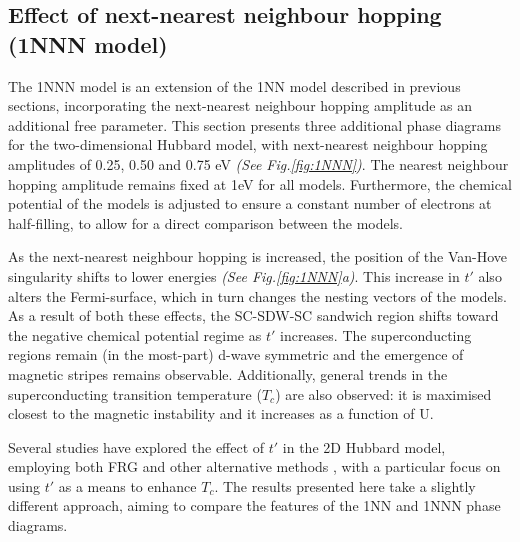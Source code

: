 \documentclass[12pt]{article}
\begin{document}
\subsection{Effect of next-nearest neighbour hopping (1NNN model)}
\label{subsec:1NNNModel}
The 1NNN model is an extension of the 1NN model described in previous sections, incorporating
the next-nearest neighbour hopping amplitude as an additional free parameter.
This section presents three additional phase diagrams
for the two-dimensional Hubbard model, with next-nearest neighbour hopping amplitudes 
of 0.25, 0.50 and 0.75 eV \textit{(See Fig.\ref{fig:1NNN})}.
The nearest neighbour hopping amplitude remains fixed at 1eV for all models. 
Furthermore, the chemical potential of the models is adjusted to ensure a 
constant number of electrons at half-filling, to allow for a direct comparison between the models. \par
\medskip
\noindent
As the next-nearest neighbour hopping is increased, the position of the Van-Hove singularity shifts to lower energies \textit{(See Fig.\ref{fig:1NNN}a)}. 
This increase in $t'$ also alters the Fermi-surface, which in turn changes the nesting vectors of the models. 
As a result of both these effects, the SC-SDW-SC sandwich 
region shifts toward the negative chemical potential regime as $t'$ increases.
The superconducting regions remain (in the most-part) d-wave symmetric and the emergence of 
magnetic stripes remains observable. Additionally, general trends in the superconducting transition
temperature ($T_c$) are also observed: it is maximised closest to the 
magnetic instability and it increases as a function of U.\par
\medskip
\noindent Several studies have explored the effect of $t'$ in the 2D Hubbard model, 
employing both FRG \cite{husemann2012incommensurate} and other alternative methods \cite{fontenele2025effects}, 
with a particular focus on using $t'$ as a means to enhance $T_c$. The results presented here take a slightly different approach, aiming to 
compare the features of the 1NN and 1NNN phase diagrams.
\end{document}
